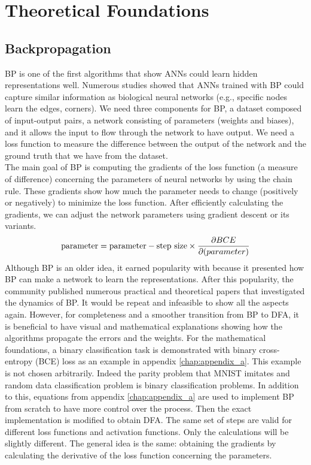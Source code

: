 \documentclass[a4paper, nobind]{templates/ociamthesis}
\begin{document}
\hypertarget{chap:chapter_1}{%
\chapter{Theoretical Foundations}\label{chap:chapter_1}}

\minitoc 

\hypertarget{backpropagation}{%
\section{Backpropagation}\label{backpropagation}}

BP is one of the first algorithms that show ANNs could learn hidden representations well. Numerous studies showed that ANNs trained with BP could capture similar information as biological neural networks (e.g., specific nodes learn the edges, corners). We need three components for BP, a dataset composed of input-output pairs, a network consisting of parameters (weights and biases), and it allows the input to flow through the network to have output. We need a loss function to measure the difference between the output of the network and the ground truth that we have from the dataset.\\
The main goal of BP is computing the gradients of the loss function (a measure of difference) concerning the parameters of neural networks by using the chain rule. These gradients show how much the parameter needs to change (positively or negatively) to minimize the loss function. After efficiently calculating the gradients, we can adjust the network parameters using gradient descent or its variants.
\[
\begin{aligned} 
\text{parameter} &= \text{parameter} - \text{step size} \times \frac{\partial BCE}{\partial \text(parameter)}  \\
\end{aligned}
\]
\noindent Although BP is an older idea, it earned popularity with \cite{Rumelhart:1986we} because it presented how BP can make a network to learn the representations. After this popularity, the community published numerous practical and theoretical papers that investigated the dynamics of BP. It would be repeat and infeasible to show all the aspects again. However, for completeness and a smoother transition from BP to DFA, it is beneficial to have visual and mathematical explanations showing how the algorithms propagate the errors and the weights. For the mathematical foundations, a binary classification task is demonstrated with binary cross-entropy (BCE) loss as an example in appendix \ref{chap:appendix_a}. This example is not chosen arbitrarily. Indeed the parity problem that MNIST imitates and random data classification problem is binary classification problems. In addition to this, equations from appendix \ref{chap:appendix_a} are used to implement BP from scratch to have more control over the process. Then the exact implementation is modified to obtain DFA. The same set of steps are valid for different loss functions and activation functions. Only the calculations will be slightly different. The general idea is the same: obtaining the gradients by calculating the derivative of the loss function concerning the parameters.
\end{document}
